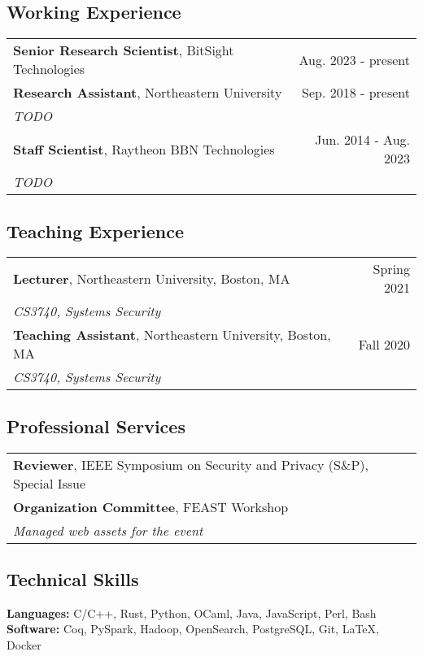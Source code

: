 \documentclass[11pt]{article}
\begin{document}
\subsection{Working Experience}
\label{sec:working-experience}

\begin{tabularx}{\textwidth}{>{\raggedright\arraybackslash}p{8cm}>{\raggedright\arraybackslash}r}
    \textbf{Senior Research Scientist}, BitSight Technologies & Aug. 2023 - present \\
    \textbf{Research Assistant}, Northeastern University & Sep. 2018 - present \\
    \textit{TODO} & \\
    \textbf{Staff Scientist}, Raytheon BBN Technologies & Jun. 2014 - Aug. 2023 \\
    \textit{TODO} & \\
\end{tabularx}

\subsection{Teaching Experience}
\label{sec:teaching-experience}

\begin{tabularx}{\textwidth}{>{\raggedright\arraybackslash}p{8cm}>{\raggedright\arraybackslash}r}
    \textbf{Lecturer}, Northeastern University, Boston, MA & Spring 2021 \\
    \textit{CS3740, Systems Security} & \\
    \textbf{Teaching Assistant}, Northeastern University, Boston, MA & Fall 2020 \\
    \textit{CS3740, Systems Security} & \\
\end{tabularx}

\subsection{Professional Services}
\label{sec:services}

\begin{tabularx}{\textwidth}{>{\raggedright\arraybackslash}p{8cm}>{\raggedright\arraybackslash}r}
    \textbf{Reviewer}, IEEE Symposium on Security and Privacy (S\&P), Special Issue & 2022 \\
    \textbf{Organization Committee}, FEAST Workshop & 2020 \\
    \textit{Managed web assets for the event} & \\
\end{tabularx}

\subsection{Technical Skills}
\label{sec:skills}

\textbf{Languages:} C/C++, Rust, Python, OCaml, Java, JavaScript, Perl, Bash \\

\textbf{Software:} Coq, PySpark, Hadoop, OpenSearch, PostgreSQL, Git, LaTeX, Docker \\
\end{document}
